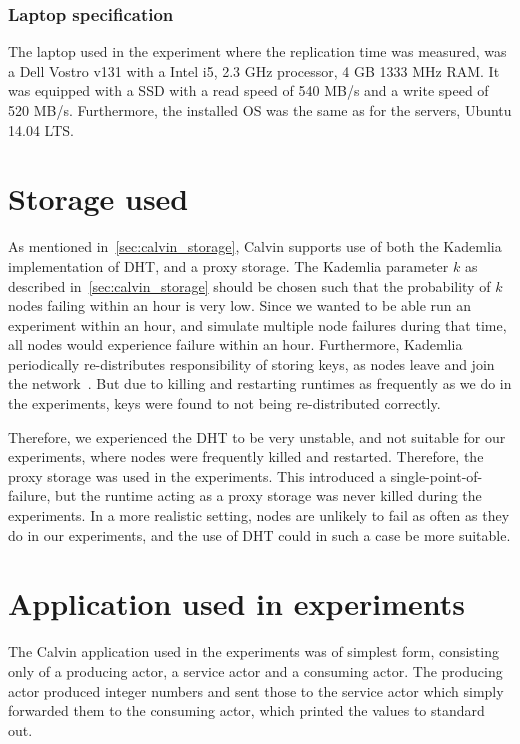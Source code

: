 \documentclass{cslthse-msc}
\begin{document}
\subsubsection{Laptop specification} \label{sec:laptop_spec}
The laptop used in the experiment where the replication time was measured, was a Dell Vostro v131 with a Intel i5, 2.3 GHz processor, 4 GB 1333 MHz RAM. It was equipped with a SSD with a read speed of 540 MB/s and a write speed of 520 MB/s. Furthermore, the installed OS was the same as for the servers, Ubuntu 14.04 LTS.


\section{Storage used} \label{sec:eval_storage}
As mentioned in~\cref{sec:calvin_storage}, Calvin supports use of both the Kademlia implementation of DHT, and a proxy storage. The Kademlia parameter $k$ as described in~\cref{sec:calvin_storage} should be chosen such that the probability of $k$ nodes failing within an hour is very low. Since we wanted to be able run an experiment within an hour, and simulate multiple node failures during that time, all nodes would experience failure within an hour. Furthermore, Kademlia periodically re-distributes responsibility of storing keys, as nodes leave and join the network~\cite{kademlia}. But due to killing and restarting runtimes as frequently as we do in the experiments, keys were found to not being re-distributed correctly. 

Therefore, we experienced the DHT to be very unstable, and not suitable for our experiments, where nodes were frequently killed and restarted. Therefore, the proxy storage was used in the experiments. This introduced a single-point-of-failure, but the runtime acting as a proxy storage was never killed during the experiments. In a more realistic setting, nodes are unlikely to fail as often as they do in our experiments, and the use of DHT could in such a case be more suitable.


\section{Application used in experiments} \label{sec:eval_application}
The Calvin application used in the experiments was of simplest form, consisting only of a producing actor, a service actor and a consuming actor. The producing actor produced integer numbers and sent those to the service actor which simply forwarded them to the consuming actor, which printed the values to standard out. 
\end{document}
